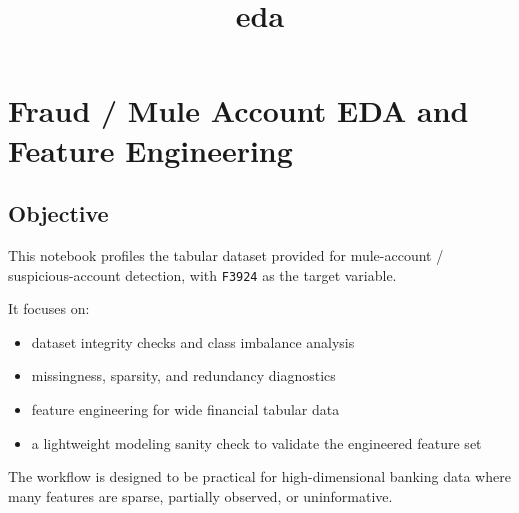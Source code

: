 \documentclass[11pt]{article}
\title{eda}
\providecommand{\tightlist}{%
      \setlength{\itemsep}{0pt}\setlength{\parskip}{0pt}}
\begin{document}
    
    \maketitle
    
    

    
    \section{Fraud / Mule Account EDA and Feature
Engineering}\label{fraud-mule-account-eda-and-feature-engineering}

\subsection{Objective}\label{objective}

This notebook profiles the tabular dataset provided for mule-account /
suspicious-account detection, with \texttt{F3924} as the target
variable.

It focuses on:

\begin{itemize}
\tightlist
\item
  dataset integrity checks and class imbalance analysis
\item
  missingness, sparsity, and redundancy diagnostics
\item
  feature engineering for wide financial tabular data
\item
  a lightweight modeling sanity check to validate the engineered feature
  set
\end{itemize}

The workflow is designed to be practical for high-dimensional banking
data where many features are sparse, partially observed, or
uninformative.
\end{document}
